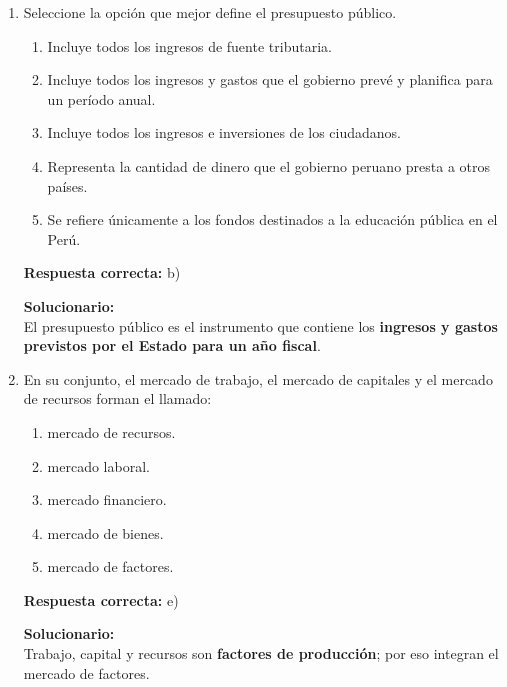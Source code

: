 \begin{enumerate}
	
	\vspace{6mm}
	
	\item Seleccione la opción que mejor define el presupuesto público.
	\begin{enumerate}[label=\alph*)]
		\item Incluye todos los ingresos de fuente tributaria.
		\item Incluye todos los ingresos y gastos que el gobierno prevé y planifica para un período anual.
		\item Incluye todos los ingresos e inversiones de los ciudadanos.
		\item Representa la cantidad de dinero que el gobierno peruano presta a otros países.
		\item Se refiere únicamente a los fondos destinados a la educación pública en el Perú.
	\end{enumerate}
	\textbf{Respuesta correcta:} b)
	
	\vspace{2mm}
	\textbf{Solucionario:}\\
	El presupuesto público es el instrumento que contiene los \textbf{ingresos y gastos previstos por el Estado para un año fiscal}.
	

	
	\vspace{6mm}
	
	\item En su conjunto, el mercado de trabajo, el mercado de capitales y el mercado de recursos forman el llamado:
	\begin{enumerate}[label=\alph*)]
		\item mercado de recursos.
		\item mercado laboral.
		\item mercado financiero.
		\item mercado de bienes.
		\item mercado de factores.
	\end{enumerate}
	\textbf{Respuesta correcta:} e)
	
	\vspace{2mm}
	\textbf{Solucionario:}\\
	Trabajo, capital y recursos son \textbf{factores de producción}; por eso integran el mercado de factores.
	

	
	\vspace{6mm}
\end{enumerate}

